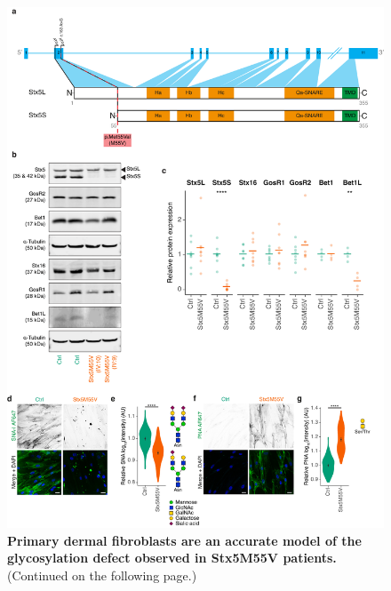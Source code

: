 \begin{figure}
    \includegraphics[keepaspectratio=true,width=\textwidth,height=\textheight]{chapters/chapter6/chapter6_Figure2.pdf}
    \caption{\textbf{Primary dermal fibroblasts are an accurate model of the glycosylation defect observed in Stx5M55V patients.} (Continued on the following page.)}
    \label{fig:ch6fig2}
\end{figure}
